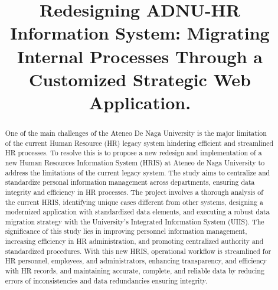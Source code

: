 \documentclass[oneside]{etd}
\title{Redesigning ADNU-HR Information System: Migrating Internal Processes Through a Customized Strategic Web Application.}
\begin{document}
\maketitle
\makerecomm
\makeacceptance
\makedeclaration


\begin{abstract}
    One of the main challenges of the Ateneo De Naga University is the major limitation of the current Human Resource (HR) legacy system hindering efficient and streamlined HR processes. To resolve this is to propose a new redesign and implementation of a new Human Resources Information System (HRIS) at Ateneo de Naga University to address the limitations of the current legacy system. The study aims to centralize and standardize personal information management across departments, ensuring data integrity and efficiency in HR processes. The project involves a thorough analysis of the current HRIS, identifying unique cases different from other systems, designing a modernized application with standardized data elements, and executing a robust data migration strategy with the University's Integrated Information System (UIIS). The significance of this study lies in improving personnel information management, increasing efficiency in HR administration, and promoting centralized authority and standardized procedures. With this new HRIS, operational workflow is streamlined for HR personnel, employees, and administrators, enhancing transparency, and efficiency with HR records, and maintaining accurate, complete, and reliable data by reducing errors of inconsistencies and data redundancies ensuring integrity.
\end{abstract}




\begingroup
\renewcommand*{\addvspace}[1]{}
\tableofcontents
\listoffigures
\listoftables
\endgroup

\beginbody
{}





% 
% 

\appendix
  
  
  
  

\nocite{*}

{
\singlespace

}


\end{document}
